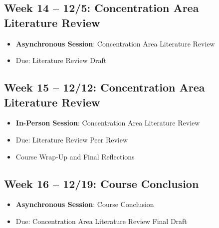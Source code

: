 \documentclass[12pt, letterpaper]{article}
\begin{document}
\subsection*{Week 14 -- 12/5: Concentration Area Literature Review}
\begin{itemize}
    \item \textbf{Asynchronous Session}: Concentration Area Literature Review
    \item Due: Literature Review Draft
\end{itemize}

\subsection*{Week 15 -- 12/12: Concentration Area Literature Review}
\begin{itemize}
    \item \textbf{In-Person Session}: Concentration Area Literature Review
    \item Due: Literature Review Peer Review
    \item Course Wrap-Up and Final Reflections
\end{itemize}

\subsection*{Week 16 -- 12/19: Course Conclusion}
\begin{itemize}
    \item \textbf{Asynchronous Session}: Course Conclusion
    \item Due: Concentration Area Literature Review Final Draft
\end{itemize}


            \singlespace
            
            
            
\end{document}
